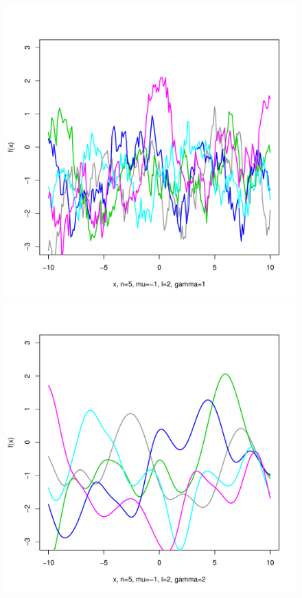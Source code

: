 \documentclass[12pt,letterpaper]{article}
\begin{document}
\begin{figure}
\begin{center}
\includegraphics[scale=0.2]{hw321/n5-m-1-l2-g2.pdf}
\includegraphics[scale=0.2]{hw321/n5-m-1-l2-g4.pdf}

\end{center}
\end{figure}
\end{document}
